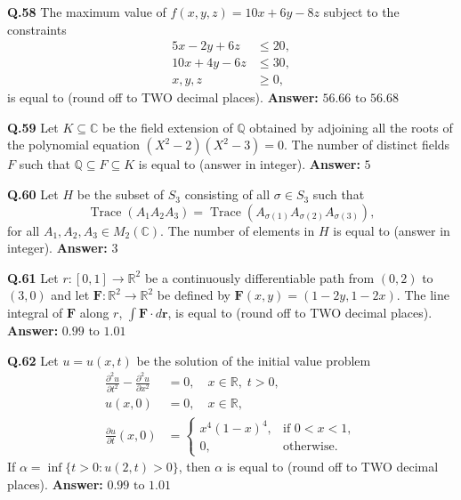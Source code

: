 \documentclass[11pt,a4paper]{article}
\newcommand{\ans}[1]{\textbf{Answer:} #1\par\medskip}
\begin{document}
\textbf{Q.58} The maximum value of $f(x, y, z) = 10x + 6y - 8z$ subject to the constraints
\begin{align*}
  5x - 2y + 6z &\le 20, \\
  10x + 4y - 6z &\le 30, \\
  x, y, z &\ge 0,
\end{align*}
is equal to \underline{\hspace{2cm}} (round off to TWO decimal places).
\ans{$56.66 \text{ to } 56.68$}

\textbf{Q.59} Let $K \subseteq \mathbb{C}$ be the field extension of $\mathbb{Q}$ obtained by adjoining all the roots of the polynomial equation $(X^2 - 2)(X^2 - 3) = 0$. The number of distinct fields $F$ such that $\mathbb{Q} \subseteq F \subseteq K$ is equal to \underline{\hspace{2cm}} (answer in integer).
\ans{$5$}

\textbf{Q.60} Let $H$ be the subset of $S_3$ consisting of all $\sigma \in S_3$ such that
\[
  \operatorname{Trace}(A_1 A_2 A_3) = \operatorname{Trace}(A_{\sigma(1)} A_{\sigma(2)} A_{\sigma(3)}),
\]
for all $A_1, A_2, A_3 \in M_2(\mathbb{C})$. The number of elements in $H$ is equal to \underline{\hspace{2cm}} (answer in integer).
\ans{$3$}

\textbf{Q.61} Let $r : [0, 1] \to \mathbb{R}^2$ be a continuously differentiable path from $(0, 2)$ to $(3, 0)$ and let $\mathbf{F} : \mathbb{R}^2 \to \mathbb{R}^2$ be defined by $\mathbf{F}(x, y) = (1 - 2y, 1 - 2x)$. The line integral of $\mathbf{F}$ along $r$, $\int \mathbf{F} \cdot d\mathbf{r}$, is equal to \underline{\hspace{2cm}} (round off to TWO decimal places).
\ans{$0.99 \text{ to } 1.01$}

\textbf{Q.62} Let $u = u(x, t)$ be the solution of the initial value problem
\begin{align*}
  \frac{\partial^2 u}{\partial t^2} - \frac{\partial^2 u}{\partial x^2} &= 0, \quad x \in \mathbb{R}, \; t > 0, \\
  u(x, 0) &= 0, \quad x \in \mathbb{R}, \\
  \frac{\partial u}{\partial t}(x, 0) &= \begin{cases} x^4(1 - x)^4, & \text{if } 0 < x < 1, \\ 0, & \text{otherwise.} \end{cases}
\end{align*}
If $\alpha = \inf\{t > 0 : u(2, t) > 0\}$, then $\alpha$ is equal to \underline{\hspace{2cm}} (round off to TWO decimal places).
\ans{$0.99 \text{ to } 1.01$}
\end{document}
